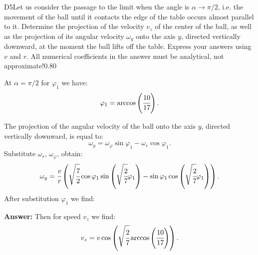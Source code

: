 \documentclass[11pt,a4paper]{article}
\begin{document}
\begin{solcard}{D5}{Let us consider the passage to the limit when the angle is $\alpha\to\pi/2$, i.e. the movement of the ball until it contacts the edge of the table occurs almost parallel to it. Determine the projection of the velocity $v_z$ of the center of the ball, as well as the projection of its angular velocity $\omega_y$ onto the axis $y$, directed vertically downward, at the moment the ball lifts off the table. Express your answers using $v$ and $r$. All numerical coefficients in the answer must be analytical, not approximate!}{0.80}

At $\alpha=\pi/2$ for $\varphi_1$ we have: $$\varphi_1=\arccos\left(\cfrac{10}{17}\right){.} $$


The projection of the angular velocity of the ball onto the axis $y$, directed vertically downward, is equal to: $$\omega_y=\omega_\varphi\sin\varphi_1-\omega_r\cos\varphi_1{.} $$Substitute $\omega_r$, $\omega_\varphi$, obtain: $$\omega_y=\cfrac{v}{r}\left(\sqrt{\cfrac{7}{2}}\cos\varphi_1\sin\left(\sqrt{\cfrac{2}{7}}\varphi_1\right)-\sin\varphi_1\cos\left(\sqrt{\cfrac{2}{7}}\varphi_1\right)\right){.} $$After substitution $\varphi_1$ we find:

\par\smallskip\noindent\textbf{Answer:} Then for speed $v_z$ we find: $$v_z=v\cos\left(\sqrt{\cfrac{2}{7}}\arccos\left(\cfrac{10}{17}\right)\right){.} $$
\end{solcard}
\end{document}
